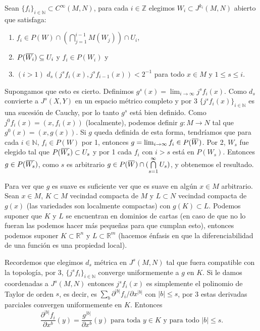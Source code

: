 \documentclass{report}
\theoremstyle{definition}
\newcommand{\overbar}[1]{\mkern 1.5mu\overline{\mkern-1.5mu#1\mkern-1.5mu}\mkern 1.5mu}
\begin{document}
Sean $\{ f_i \}_{i \in \mathbb{N}} \subset C^\infty (M,N)$, para cada $i \in \mathbb{Z}$ elegimos $W_i \subset J^{k_i} (M,N)$ abierto que satisfaga:
\begin{enumerate}
\item $f_i \in P(W) \cap \left( \bigcap\limits_{j=1}^{i-1} M(W_j) \right) \cap U_i$,
\item $P (\overbar{W_i}) \subseteq U_i $ y $f_i \in P (W_i)$ y
\item $(i > 1)$ $d_s (j^s f_i (x), j^s f_{i-1} (x) ) < 2^{-1}$ para todo $x \in M$ y $1 \leq s \leq i$.
\end{enumerate}

Supongamos que esto es cierto. Definimos $g^s (x) = \lim_{i \to \infty} j^s f_i (x)$. Como $d_s$ convierte a $J^s (X,Y)$ en un espacio m\'etrico completo y por 3 $\{ j^s f_i  (x) \}_{i \in \mathbb{N}}$ es una sucesi\'on de Cauchy, por lo tanto $g^s$ est\'a bien definido. Como $j^0 f_i (x) = (x, f_i (x) )$ (localmente), podemos definir $g : M \to N$ tal que $g^0 (x) = (x , g(x))$. Si $g$ queda definida de esta forma, tendr\'iamos que para cada $i \in \mathbb{N}$, $f_i \in P(W)$ por 1, entonces $g = \lim_{i \to \infty} f_i \in P(\overbar{W})$. Por 2, $W_s$ fue elegido tal que $P(\overbar{W_s}) \subset U_s$ y por 1 cada $f_i$ con $i >s$ est\'a en $P(W_s)$. Entonces $g \in P(\overbar{W_s})$, como $s$ es arbitrario $g \in P (\overbar{W}) \cap ( \bigcap\limits_{s=1}^\infty U_s)$, y obtenemos el resultado.

Para ver que $g$ es suave es suficiente ver que es suave en alg\'un $x \in M$ arbitrario. Sean $x \in M$, $K \subset M$ vecindad compacta de $M$ y $L \subset N$ vecindad compacta de $g(x)$ (las variedades son localmente compactas) con $g(K) \subset L$. Podemos suponer que $K$ y $L$ se encuentran en dominios de cartas (en caso de que no lo fueran las podemos hacer m\'as pequeñas para que cumplan esto), entonces podemos suponer $K \subset \mathbb{R}^n $ y $L \subset \mathbb{R}^m$ (hacemos \'enfasis en que la diferenciabilidad de una funci\'on es una propiedad local).

Recordemos que elegimos $d_s$ m\'etrica en $J^s (M,N)$ tal que fuera compatible con la topolog\'ia, por 3, $\{ j^s f_i \}_{i \in \mathbb{N}}$ converge uniformemente a $g$ en $K$. Si le damos coordenadas a $J^s (M,N)$ entonces $j^s f_i (x)$ es simplemente el polinomio de Taylor de orden $s$, es decir, es $ \sum\limits_{b} \partial^{\vert b \vert} f_i  / \partial x^{\vert b \vert}$ con $\vert b \vert \leq s$, por 3 estas derivadas parciales convergen uniformemente en $K$. Entonces $$ \frac{\partial^{\vert b \vert} f_i}{\partial x^b} (y) = \frac{g^{\vert b \vert}}{\partial x^b} (y) \text{ para toda } y \in K \text{ y para todo } \vert b \vert \leq s.$$
\end{document}
